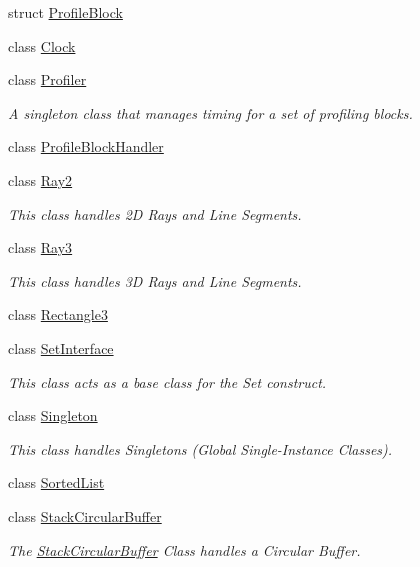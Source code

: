 \begin{CompactItemize}
\item 
struct \hyperlink{struct_j_g_t_l_1_1_profile_block}{Profile\-Block}
\item 
class \hyperlink{class_j_g_t_l_1_1_clock}{Clock}
\item 
class \hyperlink{class_j_g_t_l_1_1_profiler}{Profiler}
\begin{CompactList}\small\item\em A singleton class that manages timing for a set of profiling blocks. \item\end{CompactList}\item 
class \hyperlink{class_j_g_t_l_1_1_profile_block_handler}{Profile\-Block\-Handler}
\item 
class \hyperlink{class_j_g_t_l_1_1_ray2}{Ray2}
\begin{CompactList}\small\item\em This class handles 2D Rays and Line Segments. \item\end{CompactList}\item 
class \hyperlink{class_j_g_t_l_1_1_ray3}{Ray3}
\begin{CompactList}\small\item\em This class handles 3D Rays and Line Segments. \item\end{CompactList}\item 
class \hyperlink{class_j_g_t_l_1_1_rectangle3}{Rectangle3}
\item 
class \hyperlink{class_j_g_t_l_1_1_set_interface}{Set\-Interface}
\begin{CompactList}\small\item\em This class acts as a base class for the Set construct. \item\end{CompactList}\item 
class \hyperlink{class_j_g_t_l_1_1_singleton}{Singleton}
\begin{CompactList}\small\item\em This class handles Singletons (Global Single-Instance Classes). \item\end{CompactList}\item 
class \hyperlink{class_j_g_t_l_1_1_sorted_list}{Sorted\-List}
\item 
class \hyperlink{class_j_g_t_l_1_1_stack_circular_buffer}{Stack\-Circular\-Buffer}
\begin{CompactList}\small\item\em The \hyperlink{class_j_g_t_l_1_1_stack_circular_buffer}{Stack\-Circular\-Buffer} Class handles a Circular Buffer. \item\end{CompactList}\item 

\end{CompactItemize}
